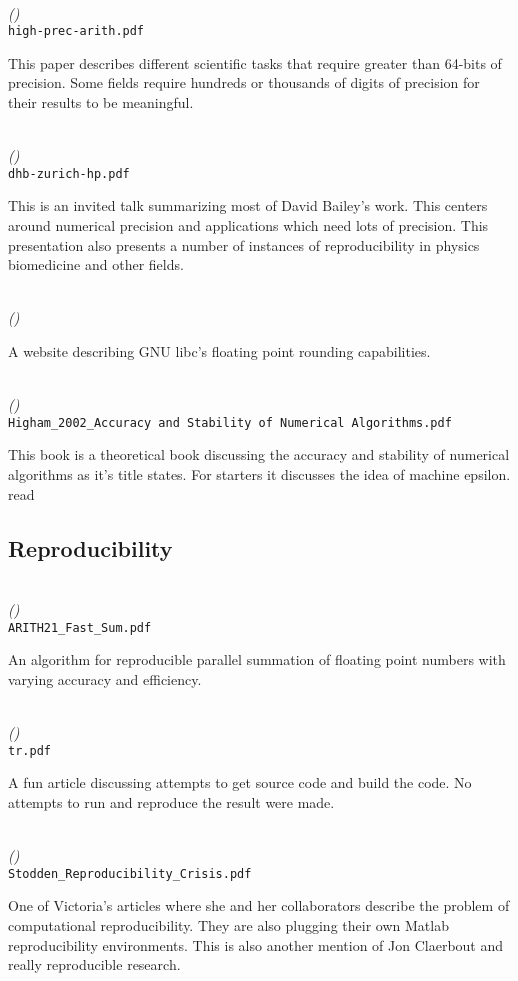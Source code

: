 \documentclass{article}
\newcommand{\Read}{
	\gls{read}
}
\newenvironment{refdef}[2] {
	\noindent \textbf{\citetitle{#1}} \cite{#1}\\ \citejournalorbooktitle{#1} \textit{(\citeyear{#1})}\\ \texttt{#2} \vspace{0.2in} \par 
} {
\vspace{0.2in}
}
\begin{document}
\begin{refdef}{high-precision-arith-in-science}{high-prec-arith.pdf}
This paper describes different scientific tasks that require greater than 64-bits of precision. Some fields require hundreds or thousands of digits of precision for their results to be meaningful.
\end{refdef}

\begin{refdef}{dhb-zurich-hp}{dhb-zurich-hp.pdf}
This is an invited talk summarizing most of David Bailey's work. This centers around numerical precision and applications which need lots of precision. This presentation also presents a number of instances of reproducibility in physics biomedicine and other fields.
\end{refdef}

\begin{refdef}{gnu-libc-rounding}{}
A website describing GNU libc's floating point rounding capabilities.
\end{refdef}

\begin{refdef}{higham-numerical-accuracy-and-stability}{Higham\_2002\_Accuracy and Stability of Numerical Algorithms.pdf}
This book is a theoretical book discussing the accuracy and stability of numerical algorithms as it's title states. For starters it discusses the idea of machine epsilon. \Read
\end{refdef}

\subsection{Reproducibility}

\begin{refdef}{repro-fast-sum}{ARITH21\_Fast\_Sum.pdf}
An algorithm for reproducible parallel summation of floating point numbers with varying accuracy and efficiency.
\end{refdef}


\begin{refdef}{collberg2014measuring}{tr.pdf}
A fun article discussing attempts to get source code and build the code. No attempts to run and reproduce the result were made.
\end{refdef}

\begin{refdef}{stodden-reproducibility-crisis}{Stodden\_Reproducibility\_Crisis.pdf}
One of Victoria's articles where she and her collaborators describe the problem of computational reproducibility. They are also plugging their own Matlab reproducibility environments. This is also another mention of Jon Claerbout and really reproducible research.
\end{refdef}
\end{document}
